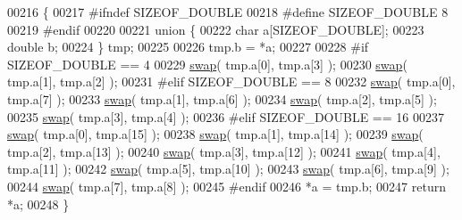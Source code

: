 \begin{DoxyCode}
00216 \{
00217 \textcolor{preprocessor}{#ifndef SIZEOF\_DOUBLE}
00218 \textcolor{preprocessor}{#define SIZEOF\_DOUBLE 8}
00219 \textcolor{preprocessor}{#endif}
00220 
00221     \textcolor{keyword}{union }\{
00222         \textcolor{keywordtype}{char}   a[SIZEOF\_DOUBLE];
00223         \textcolor{keywordtype}{double} b;
00224     \} tmp;
00225 
00226     tmp.b = *a;
00227 
00228 \textcolor{preprocessor}{#if SIZEOF\_DOUBLE == 4}
00229     \hyperlink{endian_8c_a3ca5ecd34b04d6a243c054ac3a57f68d}{swap}( tmp.a[0], tmp.a[3] );
00230     \hyperlink{endian_8c_a3ca5ecd34b04d6a243c054ac3a57f68d}{swap}( tmp.a[1], tmp.a[2] );
00231 \textcolor{preprocessor}{#elif SIZEOF\_DOUBLE == 8}
00232     \hyperlink{endian_8c_a3ca5ecd34b04d6a243c054ac3a57f68d}{swap}( tmp.a[0], tmp.a[7] );
00233     \hyperlink{endian_8c_a3ca5ecd34b04d6a243c054ac3a57f68d}{swap}( tmp.a[1], tmp.a[6] );
00234     \hyperlink{endian_8c_a3ca5ecd34b04d6a243c054ac3a57f68d}{swap}( tmp.a[2], tmp.a[5] );
00235     \hyperlink{endian_8c_a3ca5ecd34b04d6a243c054ac3a57f68d}{swap}( tmp.a[3], tmp.a[4] );
00236 \textcolor{preprocessor}{#elif SIZEOF\_DOUBLE == 16}
00237     \hyperlink{endian_8c_a3ca5ecd34b04d6a243c054ac3a57f68d}{swap}( tmp.a[0], tmp.a[15] );
00238     \hyperlink{endian_8c_a3ca5ecd34b04d6a243c054ac3a57f68d}{swap}( tmp.a[1], tmp.a[14] );
00239     \hyperlink{endian_8c_a3ca5ecd34b04d6a243c054ac3a57f68d}{swap}( tmp.a[2], tmp.a[13] );
00240     \hyperlink{endian_8c_a3ca5ecd34b04d6a243c054ac3a57f68d}{swap}( tmp.a[3], tmp.a[12] );
00241     \hyperlink{endian_8c_a3ca5ecd34b04d6a243c054ac3a57f68d}{swap}( tmp.a[4], tmp.a[11] );
00242     \hyperlink{endian_8c_a3ca5ecd34b04d6a243c054ac3a57f68d}{swap}( tmp.a[5], tmp.a[10] );
00243     \hyperlink{endian_8c_a3ca5ecd34b04d6a243c054ac3a57f68d}{swap}( tmp.a[6], tmp.a[9] );
00244     \hyperlink{endian_8c_a3ca5ecd34b04d6a243c054ac3a57f68d}{swap}( tmp.a[7], tmp.a[8] );
00245 \textcolor{preprocessor}{#endif}
00246     *a = tmp.b;
00247     \textcolor{keywordflow}{return} *a;
00248 \}
\end{DoxyCode}
